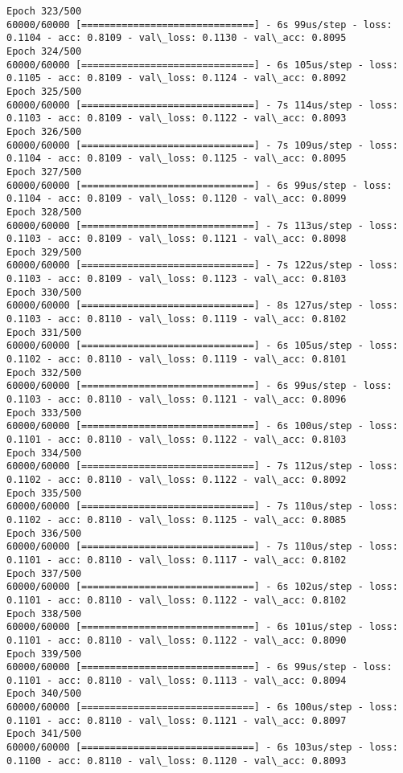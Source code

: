 \documentclass[11pt]{article}
\begin{document}
\begin{Verbatim}[commandchars=\\\{\}]
Epoch 323/500
60000/60000 [==============================] - 6s 99us/step - loss: 0.1104 - acc: 0.8109 - val\_loss: 0.1130 - val\_acc: 0.8095
Epoch 324/500
60000/60000 [==============================] - 6s 105us/step - loss: 0.1105 - acc: 0.8109 - val\_loss: 0.1124 - val\_acc: 0.8092
Epoch 325/500
60000/60000 [==============================] - 7s 114us/step - loss: 0.1103 - acc: 0.8109 - val\_loss: 0.1122 - val\_acc: 0.8093
Epoch 326/500
60000/60000 [==============================] - 7s 109us/step - loss: 0.1104 - acc: 0.8109 - val\_loss: 0.1125 - val\_acc: 0.8095
Epoch 327/500
60000/60000 [==============================] - 6s 99us/step - loss: 0.1104 - acc: 0.8109 - val\_loss: 0.1120 - val\_acc: 0.8099
Epoch 328/500
60000/60000 [==============================] - 7s 113us/step - loss: 0.1103 - acc: 0.8109 - val\_loss: 0.1121 - val\_acc: 0.8098
Epoch 329/500
60000/60000 [==============================] - 7s 122us/step - loss: 0.1103 - acc: 0.8109 - val\_loss: 0.1123 - val\_acc: 0.8103
Epoch 330/500
60000/60000 [==============================] - 8s 127us/step - loss: 0.1103 - acc: 0.8110 - val\_loss: 0.1119 - val\_acc: 0.8102
Epoch 331/500
60000/60000 [==============================] - 6s 105us/step - loss: 0.1102 - acc: 0.8110 - val\_loss: 0.1119 - val\_acc: 0.8101
Epoch 332/500
60000/60000 [==============================] - 6s 99us/step - loss: 0.1103 - acc: 0.8110 - val\_loss: 0.1121 - val\_acc: 0.8096
Epoch 333/500
60000/60000 [==============================] - 6s 100us/step - loss: 0.1101 - acc: 0.8110 - val\_loss: 0.1122 - val\_acc: 0.8103
Epoch 334/500
60000/60000 [==============================] - 7s 112us/step - loss: 0.1102 - acc: 0.8110 - val\_loss: 0.1122 - val\_acc: 0.8092
Epoch 335/500
60000/60000 [==============================] - 7s 110us/step - loss: 0.1102 - acc: 0.8110 - val\_loss: 0.1125 - val\_acc: 0.8085
Epoch 336/500
60000/60000 [==============================] - 7s 110us/step - loss: 0.1101 - acc: 0.8110 - val\_loss: 0.1117 - val\_acc: 0.8102
Epoch 337/500
60000/60000 [==============================] - 6s 102us/step - loss: 0.1101 - acc: 0.8110 - val\_loss: 0.1122 - val\_acc: 0.8102
Epoch 338/500
60000/60000 [==============================] - 6s 101us/step - loss: 0.1101 - acc: 0.8110 - val\_loss: 0.1122 - val\_acc: 0.8090
Epoch 339/500
60000/60000 [==============================] - 6s 99us/step - loss: 0.1101 - acc: 0.8110 - val\_loss: 0.1113 - val\_acc: 0.8094
Epoch 340/500
60000/60000 [==============================] - 6s 100us/step - loss: 0.1101 - acc: 0.8110 - val\_loss: 0.1121 - val\_acc: 0.8097
Epoch 341/500
60000/60000 [==============================] - 6s 103us/step - loss: 0.1100 - acc: 0.8110 - val\_loss: 0.1120 - val\_acc: 0.8093

\end{Verbatim}
\end{document}
